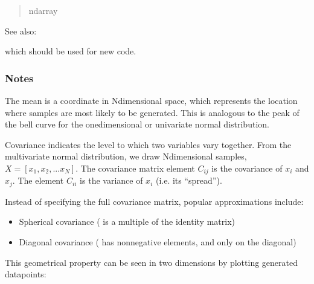 \documentclass[letterpaper,10pt,english]{sphinxmanual}
\begin{document}
\begin{fulllineitems}
\begin{quote}
\begin{description}
\sphinxAtStartPar
ndarray

\end{description}\end{quote}


\begin{sphinxseealso}{See also:}
\begin{description}
\sphinxAtStartPar
which should be used for new code.

\end{description}


\end{sphinxseealso}

\subsubsection*{Notes}

\sphinxAtStartPar
The mean is a coordinate in N\sphinxhyphen{}dimensional space, which represents the
location where samples are most likely to be generated.  This is
analogous to the peak of the bell curve for the one\sphinxhyphen{}dimensional or
univariate normal distribution.

\sphinxAtStartPar
Covariance indicates the level to which two variables vary together.
From the multivariate normal distribution, we draw N\sphinxhyphen{}dimensional
samples, \(X = [x_1, x_2, ... x_N]\).  The covariance matrix
element \(C_{ij}\) is the covariance of \(x_i\) and \(x_j\).
The element \(C_{ii}\) is the variance of \(x_i\) (i.e. its
“spread”).

\sphinxAtStartPar
Instead of specifying the full covariance matrix, popular
approximations include:
\begin{itemize}
\item {} 
\sphinxAtStartPar
Spherical covariance ( is a multiple of the identity matrix)

\item {} 
\sphinxAtStartPar
Diagonal covariance ( has non\sphinxhyphen{}negative elements, and only on
the diagonal)

\end{itemize}

\sphinxAtStartPar
This geometrical property can be seen in two dimensions by plotting
generated data\sphinxhyphen{}points:

\begin{sphinxVerbatim}[commandchars=\\\{\}]
  \PYG{p}{[} \PYG{p}{]}
  \PYG{p}{[}\PYG{p}{[} \PYG{p}{]} \PYG{p}{[} \PYG{p}{]}\PYG{p}{]}  
\end{sphinxVerbatim}


\end{fulllineitems}
\end{document}
